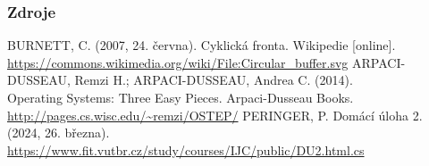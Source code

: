 \documentclass[]{fitthesispresn}
\begin{document}
    \begin{frame}
        \frametitle{Zdroje}
        \centering
        \begin{thebibliography}{}
             BURNETT, C. (2007, 24. června). Cyklická fronta. Wikipedie [online].\\\url{https://commons.wikimedia.org/wiki/File:Circular_buffer.svg}
             ARPACI-DUSSEAU, Remzi H.; ARPACI-DUSSEAU, Andrea C. (2014).\\Operating Systems: Three Easy Pieces. Arpaci-Dusseau Books. \url{http://pages.cs.wisc.edu/~remzi/OSTEP/}
             PERINGER, P. Domácí úloha 2. (2024, 26. března).\\ \url{https://www.fit.vutbr.cz/study/courses/IJC/public/DU2.html.cs}
        \end{thebibliography}
    \end{frame}
\end{document}
